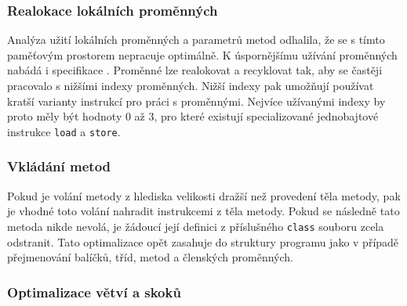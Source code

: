 
\subsubsection{Realokace lokálních proměnných}
Analýza užití lokálních proměnných a parametrů metod odhalila, že se s tímto paměťovým prostorem nepracuje optimálně. K úspornějšímu užívání proměnných nabádá i specifikace \cite{Lindholm:JVM}. Proměnné lze realokovat a recyklovat tak, aby se častěji pracovalo s nižšími indexy proměnných. Nižší indexy pak umožňují používat kratší varianty instrukcí pro práci s proměnnými. Nejvíce užívanými indexy by proto měly být hodnoty 0 až 3, pro které existují specializované jednobajtové instrukce \texttt{load} a \texttt{store}. 

\subsubsection{Vkládání metod}
Pokud je volání metody z hlediska velikosti dražší než provedení těla metody, pak je vhodné toto volání nahradit instrukcemi z těla metody. Pokud se následně tato metoda nikde nevolá, je žádoucí její definici z příslušného \texttt{class} souboru zcela odstranit. Tato optimalizace opět zasahuje do struktury programu jako v případě přejmenování balíčků, tříd, metod a členských proměnných.

\subsubsection{Optimalizace větví a skoků}



